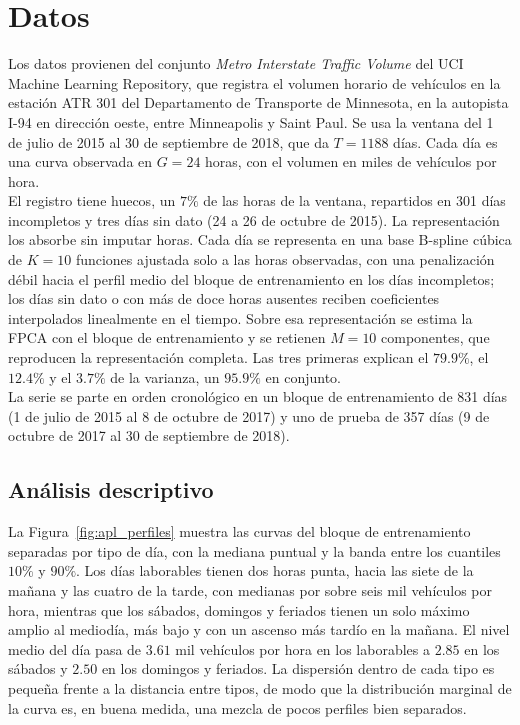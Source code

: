 \section{Datos}
\label{04_01_00_datos}

Los datos provienen del conjunto \emph{Metro Interstate Traffic Volume} del UCI Machine Learning Repository, que registra el volumen horario de vehículos en la estación ATR 301 del Departamento de Transporte de Minnesota, en la autopista I-94 en dirección oeste, entre Minneapolis y Saint Paul. %
Se usa la ventana del 1 de julio de 2015 al 30 de septiembre de 2018, que da $T = 1188$ días. Cada día es una curva observada en $G = 24$ horas, con el volumen en miles de vehículos por hora.\\

El registro tiene huecos, un $7\%$ de las horas de la ventana, repartidos en 301 días incompletos y tres días sin dato (24 a 26 de octubre de 2015). La representación los absorbe sin imputar horas. Cada día se representa en una base B-spline cúbica de $K = 10$ funciones ajustada solo a las horas observadas, con una penalización débil hacia el perfil medio del bloque de entrenamiento en los días incompletos; los días sin dato o con más de doce horas ausentes reciben coeficientes interpolados linealmente en el tiempo. Sobre esa representación se estima la FPCA con el bloque de entrenamiento y se retienen $M = 10$ componentes, que reproducen la representación completa. Las tres primeras explican el $79.9\%$, el $12.4\%$ y el $3.7\%$ de la varianza, un $95.9\%$ en conjunto.\\

La serie se parte en orden cronológico en un bloque de entrenamiento de 831 días (1 de julio de 2015 al 8 de octubre de 2017) y uno de prueba de 357 días (9 de octubre de 2017 al 30 de septiembre de 2018).

\subsection{Análisis descriptivo}
\label{04_01_01_descriptivo}

La Figura~\ref{fig:apl_perfiles} muestra las curvas del bloque de entrenamiento separadas por tipo de día, con la mediana puntual y la banda entre los cuantiles $10\%$ y $90\%$. Los días laborables tienen dos horas punta, hacia las siete de la mañana y las cuatro de la tarde, con medianas por sobre seis mil vehículos por hora, mientras que los sábados, domingos y feriados tienen un solo máximo amplio al mediodía, más bajo y con un ascenso más tardío en la mañana. El nivel medio del día pasa de $3.61$ mil vehículos por hora en los laborables a $2.85$ en los sábados y $2.50$ en los domingos y feriados. La dispersión dentro de cada tipo es pequeña frente a la distancia entre tipos, de modo que la distribución marginal de la curva es, en buena medida, una mezcla de pocos perfiles bien separados.

